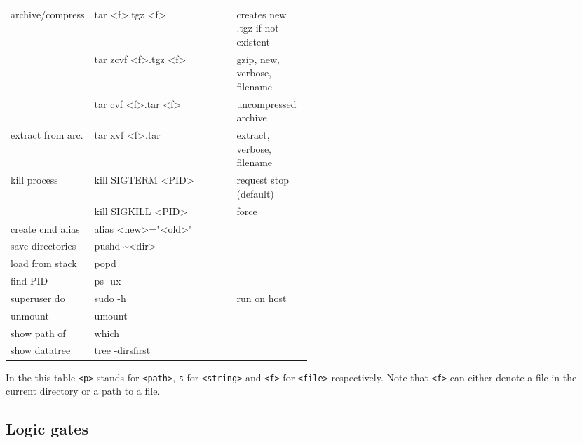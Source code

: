 {    \begin{tabularx}{\linewidth}{@{} p{0.25\linewidth}>{\ttfamily}lp{0.25\linewidth} @{}}
        archive/compress  & tar <f>.tgz <f>            & creates new .tgz if not existent \\ %
                          & tar zcvf <f>.tgz <f>       & gzip, new, verbose, filename     \\
                          & tar cvf <f>.tar <f>        & uncompressed archive             \\
        extract from arc. & tar xvf <f>.tar            & extract, verbose, filename       \\
        kill process      & kill SIGTERM <PID>         & request stop (default)           \\
                          & kill SIGKILL <PID>         & force                            \\
        create cmd alias  & alias <new>="<old>"        &                                  \\ %
        save directories  & pushd \textasciitilde<dir> &                                  \\
        load from stack   & popd                       &                                  \\
        find PID          & ps -ux                     &                                  \\
        superuser do      & sudo -h                    & run on host                      \\
        unmount           & umount                     &                                  \\
        show path of      & which                      &                                  \\
        show datatree     & tree -dirsfirst            &                                  \\
        \bottomrule
    \end{tabularx}

} %

\renewcommand{\arraystretch}{1}
\setlength{\tabcolsep}{\oldtabcolsep}

In the this table \texttt{<p>} stands for \texttt{<path>}, \texttt{s} for \texttt{<string>} and \texttt{<f>} for \texttt{<file>} respectively. Note that \texttt{<f>} can either denote a file in the current directory or a path to a file.

\subsection{Logic gates}

